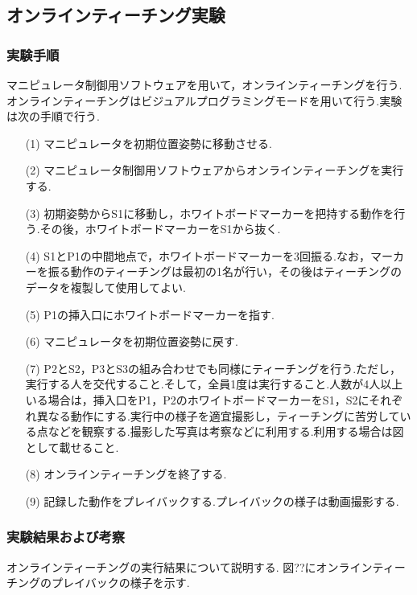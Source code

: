 \subsection{オンラインティーチング実験}

\subsubsection{実験手順}
マニピュレータ制御用ソフトウェアを用いて，オンラインティーチングを行う.
オンラインティーチングはビジュアルプログラミングモードを用いて行う.実験は次の手順で行う.

\begin{enumerate}
  \item[(1)] マニピュレータを初期位置姿勢に移動させる.
  \item[(2)] マニピュレータ制御用ソフトウェアからオンラインティーチングを実行する.
  \item[(3)] 初期姿勢からS1に移動し，ホワイトボードマーカーを把持する動作を行う.その後，ホワイトボードマーカーをS1から抜く.
  \item[(4)] S1とP1の中間地点で，ホワイトボードマーカーを3回振る.なお，マーカーを振る動作のティーチングは最初の1名が行い，その後はティーチングのデータを複製して使用してよい.
  \item[(5)] P1の挿入口にホワイトボードマーカーを指す.
  \item[(6)] マニピュレータを初期位置姿勢に戻す.
  \item[(7)] P2とS2，P3とS3の組み合わせでも同様にティーチングを行う.ただし，実行する人を交代すること.そして，全員1度は実行すること.人数が4人以上いる場合は，挿入口をP1，P2のホワイトボードマーカーをS1，S2にそれぞれ異なる動作にする.実行中の様子を適宜撮影し，ティーチングに苦労している点などを観察する.撮影した写真は考察などに利用する.利用する場合は図として載せること.
  \item[(8)] オンラインティーチングを終了する.
  \item[(9)] 記録した動作をプレイバックする.プレイバックの様子は動画撮影する.
\end{enumerate}

\subsubsection{実験結果および考察}
オンラインティーチングの実行結果について説明する.  
図??にオンラインティーチングのプレイバックの様子を示す.  


